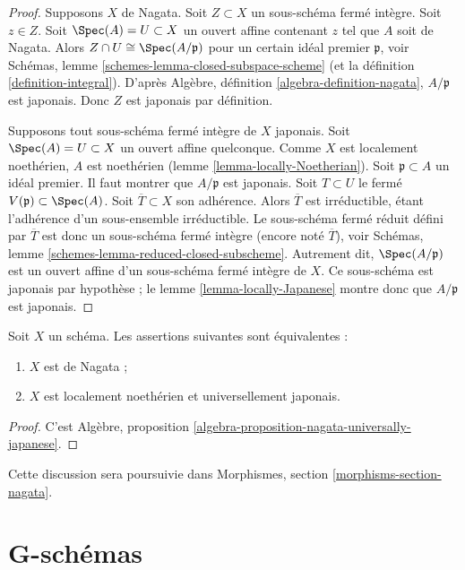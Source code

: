 \begin{proof}
Supposons $X$ de Nagata. Soit $Z \subset X$ un sous-schéma fermé intègre.
Soit $z \in Z$.
Soit $\Spec(A) = U \subset X$ un ouvert affine contenant $z$
tel que $A$ soit de Nagata. Alors
$Z \cap U \cong \Spec(A/\mathfrak p)$ pour un certain idéal premier $\mathfrak p$,
voir Schémas, lemme \ref{schemes-lemma-closed-subspace-scheme} (et la
définition \ref{definition-integral}). D'après
Algèbre, définition \ref{algebra-definition-nagata},
$A/\mathfrak p$ est japonais. Donc $Z$ est japonais par définition.

\medskip\noindent
Supposons tout sous-schéma fermé intègre de $X$ japonais.
Soit $\Spec(A) = U \subset X$ un ouvert affine quelconque.
Comme $X$ est localement noethérien, $A$ est noethérien
(lemme \ref{lemma-locally-Noetherian}). Soit $\mathfrak p \subset A$
un idéal premier. Il faut montrer que $A/\mathfrak p$ est japonais.
Soit $T \subset U$ le fermé $V(\mathfrak p) \subset \Spec(A)$.
Soit $\overline{T} \subset X$ son adhérence. Alors $\overline{T}$ est
irréductible, étant l'adhérence d'un sous-ensemble irréductible. Le sous-schéma
fermé réduit défini par $\overline{T}$ est donc un sous-schéma fermé intègre
(encore noté $\overline{T}$), voir
Schémas, lemme \ref{schemes-lemma-reduced-closed-subscheme}.
Autrement dit, $\Spec(A/\mathfrak p)$ est un ouvert
affine d'un sous-schéma fermé intègre de $X$. Ce sous-schéma est japonais
par hypothèse ; le lemme \ref{lemma-locally-Japanese} montre donc que
$A/\mathfrak p$ est japonais.
\end{proof}

\begin{lemma}
\label{lemma-nagata-universally-Japanese}
Soit $X$ un schéma.
Les assertions suivantes sont équivalentes :
\begin{enumerate}
\item $X$ est de Nagata ;
\item $X$ est localement noethérien et universellement japonais.
\end{enumerate}
\end{lemma}

\begin{proof}
C'est
Algèbre, proposition \ref{algebra-proposition-nagata-universally-japanese}.
\end{proof}

\noindent
Cette discussion sera poursuivie dans
Morphismes, section \ref{morphisms-section-nagata}.

\section{G-schémas}
\label{section-G-scheme}

